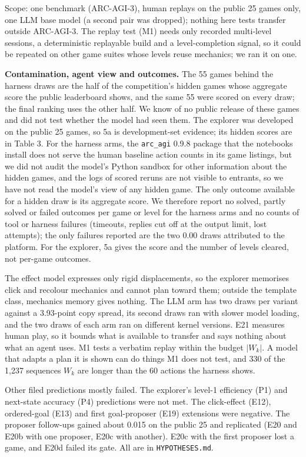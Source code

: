 \documentclass[
  11pt,
]{article}
\begin{document}
Scope: one benchmark (ARC-AGI-3), human replays on the public 25 games
only, one LLM base model (a second pair was dropped); nothing here tests
transfer outside ARC-AGI-3. The replay test (M1) needs only recorded
multi-level sessions, a deterministic replayable build and a
level-completion signal, so it could be repeated on other game suites
whose levels reuse mechanics; we ran it on one.

\textbf{Contamination, agent view and outcomes.} The 55 games behind the
harness draws are the half of the competition's hidden games whose
aggregate score the public leaderboard shows, and the same 55 were
scored on every draw; the final ranking uses the other half. We know of
no public release of these games and did not test whether the model had
seen them. The explorer was developed on the public 25 games, so 5a is
development-set evidence; its hidden scores are in Table 3. For the
harness arms, the \texttt{arc\_agi} 0.9.8 package that the notebooks
install does not serve the human baseline action counts in its game
listings, but we did not audit the model's Python sandbox for other
information about the hidden games, and the logs of scored reruns are
not visible to entrants, so we have not read the model's view of any
hidden game. The only outcome available for a hidden draw is its
aggregate score. We therefore report no solved, partly solved or failed
outcomes per game or level for the harness arms and no counts of tool or
harness failures (timeouts, replies cut off at the output limit, lost
attempts); the only failures reported are the two 0.00 draws attributed
to the platform. For the explorer, 5a gives the score and the number of
levels cleared, not per-game outcomes.

The effect model expresses only rigid displacements, so the explorer
memorises click and recolour mechanics and cannot plan toward them;
outside the template class, mechanics memory gives nothing. The LLM arm
has two draws per variant against a 3.93-point copy spread, its second
draws ran with slower model loading, and the two draws of each arm ran
on different kernel versions. E21 measures human play, so it bounds what
is available to transfer and says nothing about what an agent uses. M1
tests a verbatim replay within the budget \(|W_k|\). A model that adapts
a plan it is shown can do things M1 does not test, and 330 of the 1,237
sequences \(W_k\) are longer than the 60 actions the harness shows.

Other filed predictions mostly failed. The explorer's level-1 efficiency
(P1) and next-state accuracy (P4) predictions were not met. The
click-effect (E12), ordered-goal (E13) and first goal-proposer (E19)
extensions were negative. The proposer follow-ups gained about 0.015 on
the public 25 and replicated (E20 and E20b with one proposer, E20c with
another). E20c with the first proposer lost a game, and E20d failed its
gate. All are in \texttt{HYPOTHESES.md}.
\end{document}
